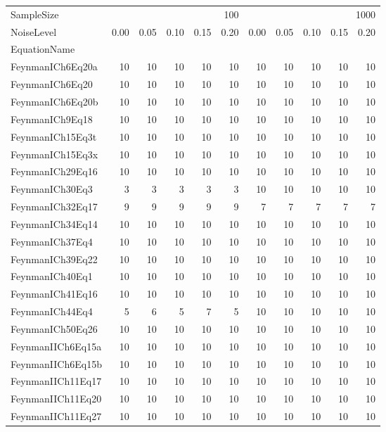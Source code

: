 \begin{tabular}{lrrrrrrrrrr}
\toprule
SampleSize & \multicolumn{5}{r}{100} & \multicolumn{5}{r}{1000} \\
NoiseLevel & 0.00 & 0.05 & 0.10 & 0.15 & 0.20 & 0.00 & 0.05 & 0.10 & 0.15 & 0.20 \\
EquationName &  &  &  &  &  &  &  &  &  &  \\
\midrule
FeynmanICh6Eq20a & 10 & 10 & 10 & 10 & 10 & 10 & 10 & 10 & 10 & 10 \\
FeynmanICh6Eq20 & 10 & 10 & 10 & 10 & 10 & 10 & 10 & 10 & 10 & 10 \\
FeynmanICh6Eq20b & 10 & 10 & 10 & 10 & 10 & 10 & 10 & 10 & 10 & 10 \\
FeynmanICh9Eq18 & 10 & 10 & 10 & 10 & 10 & 10 & 10 & 10 & 10 & 10 \\
FeynmanICh15Eq3t & 10 & 10 & 10 & 10 & 10 & 10 & 10 & 10 & 10 & 10 \\
FeynmanICh15Eq3x & 10 & 10 & 10 & 10 & 10 & 10 & 10 & 10 & 10 & 10 \\
FeynmanICh29Eq16 & 10 & 10 & 10 & 10 & 10 & 10 & 10 & 10 & 10 & 10 \\
FeynmanICh30Eq3 & 3 & 3 & 3 & 3 & 3 & 10 & 10 & 10 & 10 & 10 \\
FeynmanICh32Eq17 & 9 & 9 & 9 & 9 & 9 & 7 & 7 & 7 & 7 & 7 \\
FeynmanICh34Eq14 & 10 & 10 & 10 & 10 & 10 & 10 & 10 & 10 & 10 & 10 \\
FeynmanICh37Eq4 & 10 & 10 & 10 & 10 & 10 & 10 & 10 & 10 & 10 & 10 \\
FeynmanICh39Eq22 & 10 & 10 & 10 & 10 & 10 & 10 & 10 & 10 & 10 & 10 \\
FeynmanICh40Eq1 & 10 & 10 & 10 & 10 & 10 & 10 & 10 & 10 & 10 & 10 \\
FeynmanICh41Eq16 & 10 & 10 & 10 & 10 & 10 & 10 & 10 & 10 & 10 & 10 \\
FeynmanICh44Eq4 & 5 & 6 & 5 & 7 & 5 & 10 & 10 & 10 & 10 & 10 \\
FeynmanICh50Eq26 & 10 & 10 & 10 & 10 & 10 & 10 & 10 & 10 & 10 & 10 \\
FeynmanIICh6Eq15a & 10 & 10 & 10 & 10 & 10 & 10 & 10 & 10 & 10 & 10 \\
FeynmanIICh6Eq15b & 10 & 10 & 10 & 10 & 10 & 10 & 10 & 10 & 10 & 10 \\
FeynmanIICh11Eq17 & 10 & 10 & 10 & 10 & 10 & 10 & 10 & 10 & 10 & 10 \\
FeynmanIICh11Eq20 & 10 & 10 & 10 & 10 & 10 & 10 & 10 & 10 & 10 & 10 \\
FeynmanIICh11Eq27 & 10 & 10 & 10 & 10 & 10 & 10 & 10 & 10 & 10 & 10 \\

\end{tabular}
